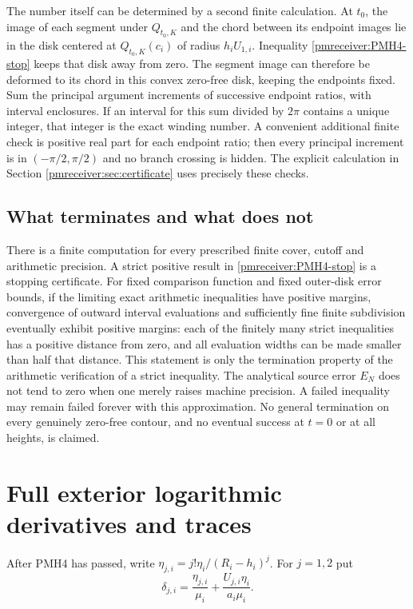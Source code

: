 The number itself can be determined by a second finite calculation.
At $t_0$, the image of each segment under $Q_{t_0,K}$ and the chord
between its endpoint images lie in the disk centered at
$Q_{t_0,K}(c_i)$ of radius $h_iU_{1,i}$. Inequality
\eqref{pmreceiver:PMH4-stop} keeps that disk away from zero. The segment image
can therefore be deformed to its chord in this convex zero-free disk,
keeping the endpoints fixed. Sum the principal argument increments
of successive endpoint ratios, with interval enclosures. If an
interval for this sum divided by $2\pi$ contains a unique integer,
that integer is the exact winding number. A convenient additional
finite check is positive real part for each endpoint ratio; then
every principal increment is in $(-\pi/2,\pi/2)$ and no branch
crossing is hidden. The explicit calculation in Section
\ref{pmreceiver:sec:certificate} uses precisely these checks.

\subsection{What terminates and what does not}

There is a finite computation for every prescribed finite cover,
cutoff and arithmetic precision. A strict positive result in
\eqref{pmreceiver:PMH4-stop} is a stopping certificate. For fixed comparison
function and fixed outer-disk error bounds, if the limiting exact
arithmetic inequalities have positive margins, convergence of
outward interval evaluations and sufficiently fine finite
subdivision eventually exhibit positive margins: each of the
finitely many strict inequalities has a positive distance from
zero, and all evaluation widths can be made smaller than half that
distance. This statement is only the termination property of the
arithmetic verification of a strict inequality.
The analytical source error $E_N$ does not tend to zero when one
merely raises machine precision. A failed inequality may remain
failed forever with this approximation. No general termination on
every genuinely zero-free contour, and no eventual success at
$t=0$ or at all heights, is claimed.

\section{Full exterior logarithmic derivatives and traces}

After PMH4 has passed, write $\eta_{j,i}=j!\eta_i/(R_i-h_i)^j$.
For $j=1,2$ put
\begin{equation}\label{pmreceiver:PMH5-delta}
 \delta_{j,i}=\frac{\eta_{j,i}}{\mu_i}
       +\frac{U_{j,i}\eta_i}{a_i\mu_i}.
\end{equation}


